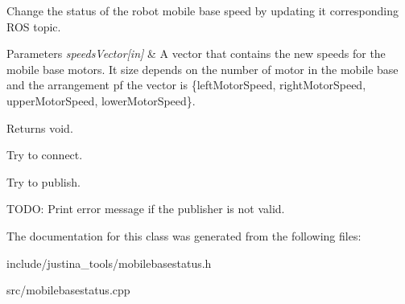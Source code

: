 Change the status of the robot mobile base speed by updating it corresponding R\+OS topic. 


\begin{DoxyParams}{Parameters}
{\em speeds\+Vector\mbox{[}in\mbox{]}} & A vector that contains the new speeds for the mobile base motors. It size depends on the number of motor in the mobile base and the arrangement pf the vector is \{left\+Motor\+Speed, right\+Motor\+Speed, upper\+Motor\+Speed, lower\+Motor\+Speed\}. \\
\hline
\end{DoxyParams}
\begin{DoxyReturn}{Returns}
void. 
\end{DoxyReturn}
Try to connect.

Try to publish.

T\+O\+DO\+: Print error message if the publisher is not valid.

The documentation for this class was generated from the following files\+:\begin{DoxyCompactItemize}
\item 
include/justina\+\_\+tools/mobilebasestatus.\+h\item 
src/mobilebasestatus.\+cpp\end{DoxyCompactItemize}
